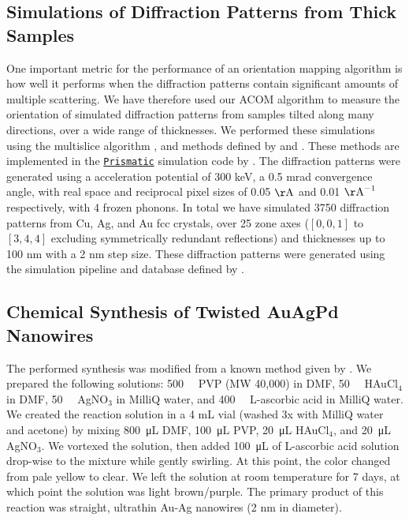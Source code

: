 \documentclass[%
 superscriptaddress,
 aip,
 amsmath,amssymb,
reprint,%
 author-year,%
longbibliography
]{revtex4-2}
\newcommand{\prismatic}{\href{https://prism-em.com/}{\texttt{Prismatic}}}
\begin{document}
\subsection*{Simulations of Diffraction Patterns from Thick Samples}


One important metric for the performance of an orientation mapping algorithm is how well it performs when the diffraction patterns contain significant amounts of multiple scattering. We have therefore used our ACOM algorithm to measure the orientation of simulated diffraction patterns from samples tilted along many directions, over a wide range of thicknesses. We performed these simulations using the multislice algorithm \citep{cowley1957scattering}, and methods defined by \cite{kirkland2020advanced} and \cite{ophus2017fast}. These methods are implemented in the \prismatic{} simulation code by \cite{dacosta2021prismatic}. The diffraction patterns were generated using a acceleration potential of 300 keV, a 0.5 mrad convergence angle, with real space and reciprocal pixel sizes of 0.05 $\rm{\AA}$ and 0.01 $\rm{\AA}^{-1}$ respectively, with 4 frozen phonons. In total we have simulated 3750 diffraction patterns from Cu, Ag, and Au fcc crystals, over 25 zone axes ($[0,0,1]$ to $[3,4,4]$ excluding symmetrically redundant reflections) and thicknesses up to 100 nm with a 2 nm step size. These diffraction patterns were generated using the simulation pipeline and database defined by \cite{rakoski2021database}.




\subsection*{Chemical Synthesis of Twisted AuAgPd Nanowires}

The performed synthesis was modified from a known method given by \cite{wang2011}. We prepared the following solutions: \SI{500}{\milli\Molar} PVP (MW 40,000) in DMF, \SI{50}{\milli\Molar} HAuCl$_{4}$ in DMF, \SI{50}{\milli\Molar} AgNO$_{3}$ in MilliQ water, and \SI{400}{\milli\Molar} L-ascorbic acid in MilliQ water. We created the reaction solution in a 4 mL vial (washed 3x with MilliQ water and acetone) by mixing \SI{800}{\micro\liter} DMF, \SI{100}{\micro\liter} PVP, \SI{20}{\micro\liter} HAuCl$_{4}$, and \SI{20}{\micro\liter} AgNO$_{3}$. We vortexed the solution, then added \SI{100}{\micro\liter} of L-ascorbic acid solution drop-wise to the mixture while gently swirling. At this point, the color changed from pale yellow to clear. We left the solution at room temperature for 7 days, at which point the solution was light brown/purple. The primary product of this reaction was straight, ultrathin Au-Ag nanowires (2 nm in diameter).
\end{document}
